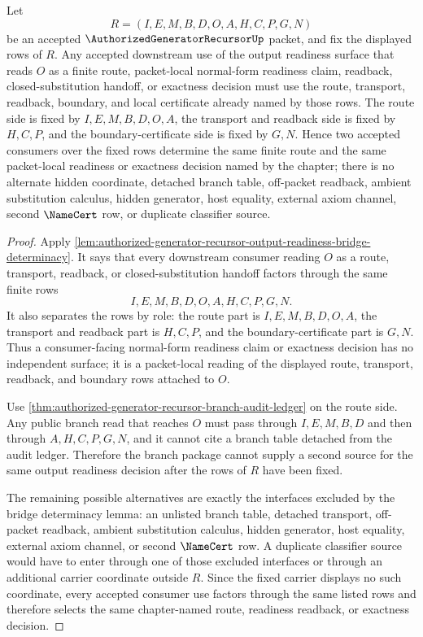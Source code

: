 \begin{corollary}
\label{cor:authorized-generator-recursor-output-readiness-determinacy}
Let
$$
R=(I,E,M,B,D,O,A,H,C,P,G,N)
$$
be an accepted $\AuthorizedGeneratorRecursorUp$ packet, and fix the displayed rows of $R$. Any accepted downstream use of the output readiness surface that reads $O$ as a finite route, packet-local normal-form readiness claim, readback, closed-substitution handoff, or exactness decision must use the route, transport, readback, boundary, and local certificate already named by those rows. The route side is fixed by $I,E,M,B,D,O,A$, the transport and readback side is fixed by $H,C,P$, and the boundary-certificate side is fixed by $G,N$. Hence two accepted consumers over the fixed rows determine the same finite route and the same packet-local readiness or exactness decision named by the chapter; there is no alternate hidden coordinate, detached branch table, off-packet readback, ambient substitution calculus, hidden generator, host equality, external axiom channel, second $\NameCert$ row, or duplicate classifier source.
\end{corollary}
\begin{proof}
Apply \autoref{lem:authorized-generator-recursor-output-readiness-bridge-determinacy}. It says that every downstream consumer reading $O$ as a route, transport, readback, or closed-substitution handoff factors through the same finite rows
$$
I,E,M,B,D,O,A,H,C,P,G,N.
$$
It also separates the rows by role: the route part is $I,E,M,B,D,O,A$, the transport and readback part is $H,C,P$, and the boundary-certificate part is $G,N$. Thus a consumer-facing normal-form readiness claim or exactness decision has no independent surface; it is a packet-local reading of the displayed route, transport, readback, and boundary rows attached to $O$.

Use \autoref{thm:authorized-generator-recursor-branch-audit-ledger} on the route side. Any public branch read that reaches $O$ must pass through $I,E,M,B,D$ and then through $A,H,C,P,G,N$, and it cannot cite a branch table detached from the audit ledger. Therefore the branch package cannot supply a second source for the same output readiness decision after the rows of $R$ have been fixed.

The remaining possible alternatives are exactly the interfaces excluded by the bridge determinacy lemma: an unlisted branch table, detached transport, off-packet readback, ambient substitution calculus, hidden generator, host equality, external axiom channel, or second $\NameCert$ row. A duplicate classifier source would have to enter through one of those excluded interfaces or through an additional carrier coordinate outside $R$. Since the fixed carrier displays no such coordinate, every accepted consumer use factors through the same listed rows and therefore selects the same chapter-named route, readiness readback, or exactness decision.
\end{proof}

